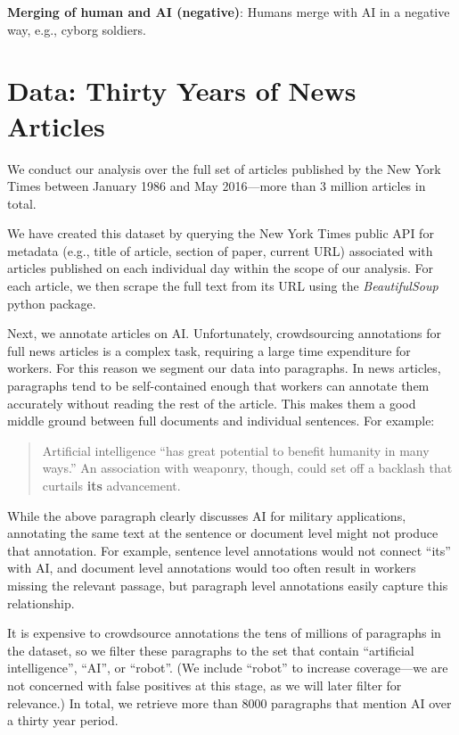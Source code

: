 \documentclass[letterpaper]{article}
\begin{document}
\textbf{Merging of human and AI (negative)}: Humans merge with AI in a negative way, e.g., cyborg soldiers.

\section{Data: Thirty Years of News Articles}

We conduct our analysis over the full set of articles published by the New York Times between January 1986 and May 2016---more than 3 million articles in total.

We have created this dataset by querying the New York Times public API for metadata (e.g., title of article, section of paper, current URL) associated with articles published on each individual day within the scope of our analysis. For each article, we then scrape the full text from its URL using the \textit{BeautifulSoup} python package.

Next, we annotate articles on AI. Unfortunately, crowdsourcing annotations for full news articles is a complex task, requiring a large time expenditure for workers. For this reason we segment our data into paragraphs. In news articles, paragraphs tend to be self-contained enough that workers can annotate them accurately without reading the rest of the article. %
This makes them a good middle ground between full documents and individual sentences. For example:

\begin{quote}
\small
Artificial intelligence ``has great potential to benefit humanity in many ways.'' An association with weaponry, though, could set off a backlash that curtails \textbf{its} advancement.
\normalsize
\end{quote}

While the above paragraph clearly discusses AI for military applications, annotating the same text at the sentence or document level might not produce that annotation. For example, sentence level annotations would not connect ``its'' with AI, and document level annotations would too often result in workers missing the relevant passage, but paragraph level annotations easily capture this relationship.

It is expensive to crowdsource annotations the tens of millions of paragraphs in the dataset, so we filter these paragraphs to the set that contain ``artificial intelligence'', ``AI'', or ``robot''. (We include ``robot'' to increase coverage---we are not concerned with false positives at this stage, as we will later filter for relevance.) In total, we retrieve more than 8000 paragraphs that mention AI over a thirty year period.
\end{document}
